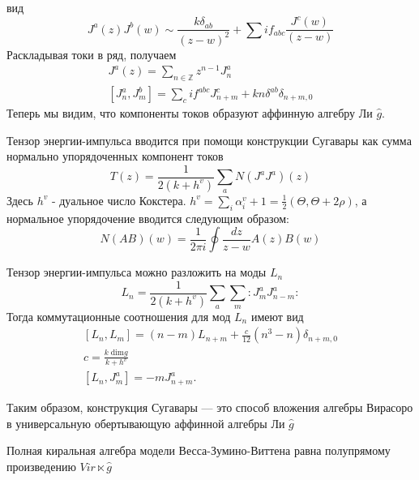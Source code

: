 вид 
\begin{equation}
  \label{eq:89}
  J^a(z) J^b(w) \sim \frac{k\delta_{ab}}{(z-w)^2}+\sum i f_{abc}\frac{J^c(w)}{(z-w)}
\end{equation}
Раскладывая токи в ряд, получаем
\begin{equation}
  \label{eq:90}
  \begin{aligned}
    J^a(z)=\sum_{n\in \mathbb Z}z^{n-1}J^a_n\\
    \left[J^a_n,J^b_m\right]=\sum_c i f^{abc}J^c_{n+m}+kn\delta^{ab}\delta_{n+m,0}
  \end{aligned}
\end{equation}
Теперь мы видим, что компоненты токов образуют аффинную алгебру Ли $\hat g$.


Тензор энергии-импульса вводится при помощи конструкции Сугавары как сумма нормально упорядоченных компонент токов
\begin{equation}
  \label{eq:102}
  T(z)=\frac{1}{2(k+h^v)}\sum_a N(J^a J^a)(z)
\end{equation}
Здесь $h^v$ - дуальное число Кокстера. $h^v=\sum_i \alpha_i^v +1=\frac{1}{2}(\Theta,\Theta+2\rho)$,
а нормальное упорядочение вводится следующим образом: 
\begin{equation}
  \label{eq:12}
  N(AB)(w)=\frac{1}{2\pi i}\oint\frac{dz}{z-w}A(z)B(w)
\end{equation}

Тензор энергии-импульса можно разложить на моды $L_n$
\begin{equation}
  \label{eq:91}
  L_n=\frac{1}{2(k+h^v)}\sum_a\sum_m:J^a_m J^a_{n-m}:
\end{equation}
Тогда коммутационные соотношения для мод $L_n$ имеют вид
\begin{equation}
  \label{eq:92}
  \begin{aligned}
    \left[L_n,L_m\right]=(n-m)L_{n+m}+\frac{c}{12}(n^3-n)\delta_{n+m,0}\\
    c=\frac{k\;\mathrm{dim}g}{k+h^v}\\
    \left[L_n,J^a_m\right]=-mJ^a_{n+m}.
  \end{aligned}
\end{equation}

Таким образом, конструкция Сугавары --- это способ вложения алгебры Вирасоро в универсальную обертывающую аффинной алгебры Ли $\hat{g}$

Полная киральная алгебра модели Весса-Зумино-Виттена равна полупрямому произведению $Vir\ltimes \hat g$

